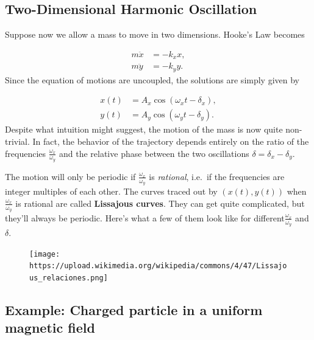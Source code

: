 \documentclass[
  letterpaper,
  DIV=11,
  numbers=noendperiod]{scrreprt}
\begin{document}
\hypertarget{two-dimensional-harmonic-oscillation}{%
\subsection{Two-Dimensional Harmonic
Oscillation}\label{two-dimensional-harmonic-oscillation}}

Suppose now we allow a mass to move in two dimensions. Hooke's Law
becomes

\[
\begin{align*}
m \ddot x &= -k_x x, \\
m \ddot y &= -k_y y.
\end{align*}
\] Since the equation of motions are uncoupled, the solutions are simply
given by

\[
\begin{align*}
x(t) &= A_x \cos(\omega_x t - \delta_x), \\
y(t) &= A_y \cos(\omega_y t - \delta_y).
\end{align*}
\] Despite what intuition might suggest, the motion of the mass is now
quite non-trivial. In fact, the behavior of the trajectory depends
entirely on the ratio of the frequencies \(\frac{\omega_x}{\omega_y}\)
and the relative phase between the two oscillations
\(\delta = \delta_x - \delta_y\).

The motion will only be periodic if \(\frac{\omega_x}{\omega_y}\) is
\emph{rational}, i.e.~if the frequencies are integer multiples of each
other. The curves traced out by \((x(t), y(t))\) when
\(\frac{\omega_x}{\omega_y}\) is rational are called \textbf{Lissajous
curves}. They can get quite complicated, but they'll always be periodic.
Here's what a few of them look like for
different\(\frac{\omega_x}{\omega_y}\) and \(\delta\).

\begin{figure}

{\centering \texttt{[image: https://upload.wikimedia.org/wikipedia/commons/4/47/Lissajous\_relaciones.png]}

}

\end{figure}

\hypertarget{example-charged-particle-in-a-uniform-magnetic-field}{%
\subsection{Example: Charged particle in a uniform magnetic
field}\label{example-charged-particle-in-a-uniform-magnetic-field}}
\end{document}
